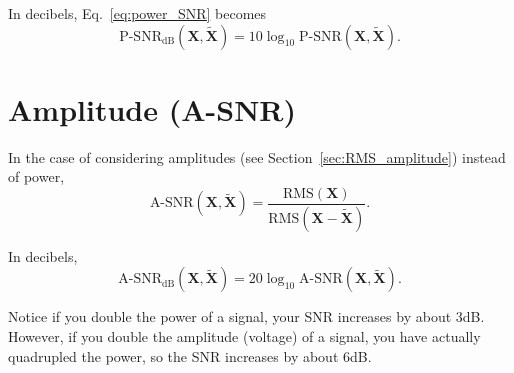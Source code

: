 In decibels, Eq.~\ref{eq:power_SNR} becomes
\begin{equation}
  \text{P-SNR}_{\text{dB}}(\bm{X},\tilde{\bm{X}}) = 10\log_{10}\text{P-SNR}(\bm{X},\tilde{\bm{X}}).
  \label{eq:power_SNR_dB}
\end{equation}

\section{Amplitude  (A-\gls{SNR})}

In the case of considering amplitudes (see
Section~\ref{sec:RMS_amplitude}) instead of power,
\begin{equation}
  \text{A-SNR}(\bm{X},\tilde{\bm{X}}) = \frac{\text{RMS}(\bm{X})}{\text{RMS}(\bm{X} - \tilde{\bm{X}})}.
  \label{eq:amplitude_SNR}
\end{equation}

In decibels,
\begin{equation}
  \text{A-SNR}_{\text{dB}}(\bm{X},\tilde{\bm{X}}) = 20\log_{10}\text{A-SNR}(\bm{X},\tilde{\bm{X}}).
  \label{eq:power_SNR}
\end{equation}

Notice if you double the power of a signal, your \gls{SNR} increases by
about 3dB. However, if you double the amplitude (voltage) of a signal,
you have actually quadrupled the power, so the \gls{SNR} increases by about
6dB.

